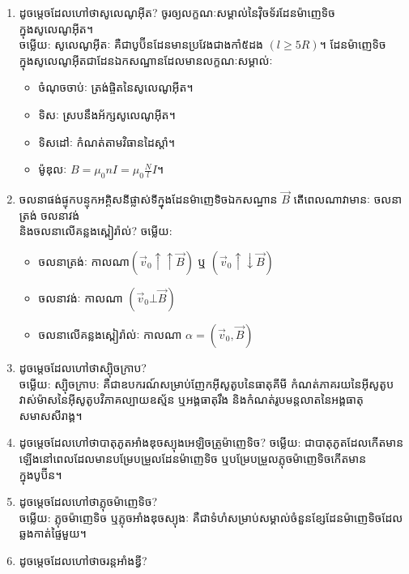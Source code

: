 \documentclass{officialexam}
\begin{document}
\begin{enumerate}[m]
\begin{itemize}
		\end{itemize}
		\item ដូចម្តេចដែលហៅថាសូលេណូអុីត? ចូរឲ្យលក្ខណៈសម្គាល់នៃវុិចទ័រដែនម៉ាញេទិចក្នុងសូលេណូអុីត។\\
		{\color{red}\sffamily ចម្លើយ}: សូលេណូអុីតៈ គឺជាបូប៊ីនដែនមានប្រវែងជាងកាំ៥ដង $\left(l\geq 5R\right)$។ ដែនម៉ាញេទិចក្នុងសូលេណូអុីតជាដែនឯកសណ្ឋានដែលមានលក្ខណៈសម្គាល់ៈ
		\begin{itemize}
			\item ចំណុចចាប់ៈ  ត្រង់ផ្ចិតនៃសូលេណូអុីត។
			\item ទិសៈ ស្របនឹងអ័ក្សសូលេណូអុីត។
			\item ទិសដៅៈ កំណត់តាមវិធានដៃស្ដាំ។
			\item ម៉ូឌុលៈ $B=\mu_0 nI=\mu_{0}\frac{N}{l}I$។
		\end{itemize}
		\item ចលនាផង់ផ្ទុកបន្ទុកអគ្គិសនីផ្លាស់ទីក្នុងដែនម៉ាញេទិចឯកសណ្ឋាន $\overrightarrow{B}$ តើពេលណាវាមានៈ ចលនាត្រង់ ចលនាវង់ \\និងចលនាលើគន្លងស្ពៀរ៉ាល់?
		{\color{red}\sffamily ចម្លើយ}:
		\begin{itemize}
			\item ចលនាត្រង់ៈ កាលណា​ $\left(\overrightarrow{v}_{0}\uparrow\uparrow\overrightarrow{B}\right)$ ឬ $\left(\overrightarrow{v}_{0}\uparrow\downarrow\overrightarrow{B}\right)$
			\item ចលនាវង់ៈ កាលណា $\left(\overrightarrow{v}_{0}\bot\overrightarrow{B}\right)$
			\item ចលនាលើគន្លងស្ពៀរ៉ាល់ៈ កាលណា $\alpha=\left(\overrightarrow{v}_{0},\overrightarrow{B}\right)$
		\end{itemize}
		\item ដូចម្តេចដែលហៅថាស្បុិចក្រាប?\\
		{\color{red}\sffamily ចម្លើយ}: ស្បុិចក្រាប: គឺជាឧបករណ៍សម្រាប់ញែកអុីសូតូបនៃធាតុគីមី កំណត់ភាគរយនៃអុីសូតូប វាស់ម៉ាសនៃអុីសូតូបវិភាគល្បាយឧស្ម័ន ឬអង្គធាតុរឹង និងកំណត់រូបមន្តលាតនៃអង្គធាតុសមាសសីរា​ង្គ​។
		\item ដូចម្តេចដែលហៅថាបាតុភូតអាំងឌុចស្យុងអេឡិចត្រូម៉ាញេទិច?
		{\color{red}\sffamily ចម្លើយ}: ជាបាតុភូតដែលកើតមានឡើងនៅពេលដែលមានបម្រែបម្រួលដែនម៉ាញេទិច ឬបម្រែបម្រួលភ្លុចម៉ាញេទិចកើតមានក្នុងបូប៊ីន។
		\item ដូចម្តេចដែលហៅថាភ្លុចម៉ាញេទិច?\\
		{\color{red}\sffamily ចម្លើយ}: ភ្លុចម៉ាញេទិច ឬភ្លុចអាំងឌុចស្យុងៈ គឺជាទំហំសម្រាប់សម្គាល់ចំនួនខ្សែដែនម៉ាញេទិចដែលឆ្លងកាត់ផ្ទៃមួយ។
		\item ដូចម្តេចដែលហៅថាចរន្តអាំងឌ្វី?\\

\end{enumerate}
\end{document}

